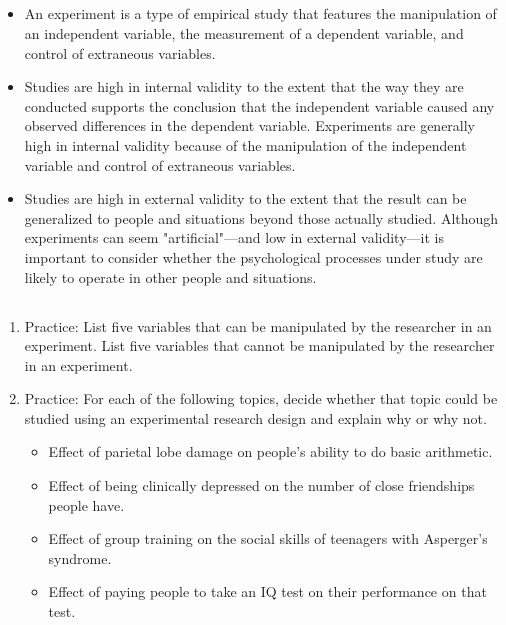 \subsection{}
\begin{fullwidth}
\begin{itemize}

\item An experiment is a type of empirical study that features the manipulation of an independent variable, the measurement of a dependent variable, and control of extraneous variables.
\item Studies are high in internal validity to the extent that the way they are conducted supports the conclusion that the independent variable caused any observed differences in the dependent variable. Experiments are generally high in internal validity because of the manipulation of the independent variable and control of extraneous variables.
\item Studies are high in external validity to the extent that the result can be generalized to people and situations beyond those actually studied. Although experiments can seem "artificial"---and low in external validity---it is important to consider whether the psychological processes under study are likely to operate in other people and situations.

\end{itemize}
\end{fullwidth}


\subsection{}
\begin{fullwidth}
\begin{enumerate}
\item Practice: List five variables that can be manipulated by the researcher in an experiment. List five variables that cannot be manipulated by the researcher in an experiment.
\item  Practice: For each of the following topics, decide whether that topic could be studied using an experimental research design and explain why or why not.
\begin{itemize}
\item Effect of parietal lobe damage on people's ability to do basic arithmetic.
\item Effect of being clinically depressed on the number of close friendships people have. 
\item Effect of group training on the social skills of teenagers with Asperger's syndrome. 
\item Effect of paying people to take an IQ test on their performance on that test.
  
\end{itemize}
\end{enumerate}
\end{fullwidth}  


